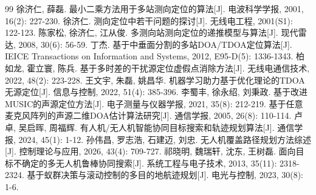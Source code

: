 \documentclass[12pt,a4paper,UTF8]{ctexart}
\begin{document}
\begin{thebibliography}{99}
 徐济仁, 薛磊. 最小二乘方法用于多站测向定位的算法[J]. 电波科学学报, 2001, 16(2): 227-230.
 徐济仁. 测向定位中若干问题的探讨[J]. 无线电工程, 2001(S1): 122-123.
 陈家松, 徐济仁, 江从俊. 多测向站测向定位的递推模型与算法[J]. 现代雷达, 2008, 30(6): 56-59.
 丁杰. 基于中垂面分割的多站DOA/TDOA定位算法[J]. IEICE Transactions on Information and Systems, 2012, E95-D(5): 1336-1343.
 柏如龙, 霍立寰, 陈兵. 基于多时差的干扰源定位虚假点消除方法[J]. 无线电通信技术, 2022, 48(2): 223-228.
 王文宇, 朱磊, 姚昌华. 机器学习助力基于优化理论的TDOA无源定位[J]. 信息与控制, 2022, 51(4): 385-396.
 李蜀丰, 徐永绍, 刘秉政. 基于改进MUSIC的声源定位方法[J]. 电子测量与仪器学报, 2021, 35(8): 212-219.
 基于任意麦克风阵列的声源二维DOA估计算法研究[J]. 通信学报, 2005, 26(8): 110-114.
 卢卓, 吴启晖, 周福辉. 有人机/无人机智能协同目标搜索和轨迹规划算法[J]. 通信学报, 2024, 45(1): 1-12.
 孙伟昌, 罗志浩, 石建迈, 刘忠. 无人机覆盖路径规划方法综述[J]. 控制理论与应用, 2026, 43(4): 709-727.
 祁晓明, 魏瑞轩, 沈东, 王树磊. 面向目标不确定的多无人机鲁棒协同搜索[J]. 系统工程与电子技术, 2013, 35(11): 2318-2324.
 基于蚁群决策与滚动控制的多目的地航迹规划[J]. 电光与控制, 2023, 30(8): 1-6.
\end{thebibliography}
\end{document}
